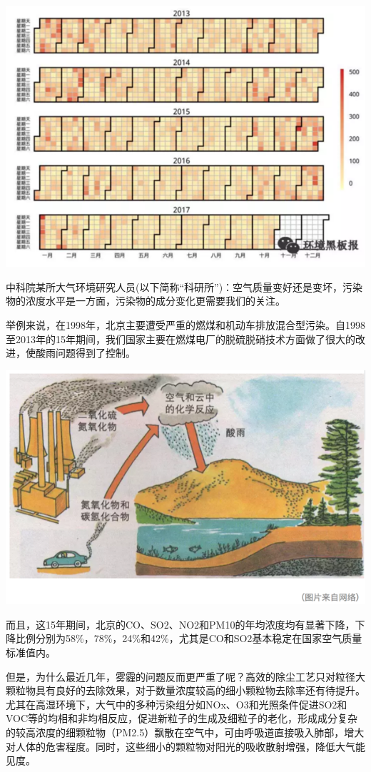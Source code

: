 \documentclass[]{book}
\begin{document}
\includegraphics[width=8.33in]{images/air1}

中科院某所大气环境研究人员(以下简称``科研所'')：空气质量变好还是变坏，污染物的浓度水平是一方面，污染物的成分变化更需要我们的关注。

举例来说，在1998年，北京主要遭受严重的燃煤和机动车排放混合型污染。自1998至2013年的15年期间，我们国家主要在燃煤电厂的脱硫脱硝技术方面做了很大的改进，使酸雨问题得到了控制。

\includegraphics[width=8.33in]{images/air2}

而且，这15年期间，北京的CO、SO2、NO2和PM10的年均浓度均有显著下降，下降比例分别为58\%，78\%，24\%和42\%，尤其是CO和SO2基本稳定在国家空气质量标准值内。

但是，为什么最近几年，雾霾的问题反而更严重了呢？高效的除尘工艺只对粒径大颗粒物具有良好的去除效果，对于数量浓度较高的细小颗粒物去除率还有待提升。尤其在高湿环境下，大气中的多种污染组分如NOx、O3和光照条件促进SO2和VOC等的均相和非均相反应，促进新粒子的生成及细粒子的老化，形成成分复杂的较高浓度的细颗粒物（PM2.5）飘散在空气中，可由呼吸道直接吸入肺部，增大对人体的危害程度。同时，这些细小的颗粒物对阳光的吸收散射增强，降低大气能见度。
\end{document}
